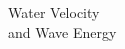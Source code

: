 \documentclass[preview]{standalone}
\begin{document}
\begin{center}
Water Velocity \\and Wave Energy
\end{center}
\end{document}
